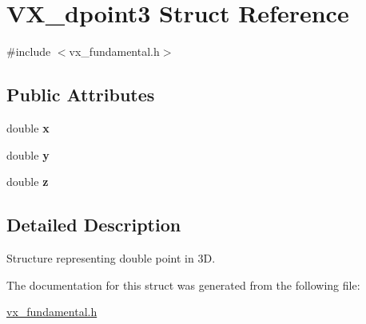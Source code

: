 \hypertarget{structVX__dpoint3}{\section{V\-X\-\_\-dpoint3 Struct Reference}
\label{structVX__dpoint3}
}


{\ttfamily \#include $<$vx\-\_\-fundamental.\-h$>$}

\subsection*{Public Attributes}
\begin{DoxyCompactItemize}
\item 
\hypertarget{structVX__dpoint3_a2e1eb10e8835c8c33f4262d98b1cf834}{double {\bfseries x}}\label{structVX__dpoint3_a2e1eb10e8835c8c33f4262d98b1cf834}

\item 
\hypertarget{structVX__dpoint3_a40815c6441413254a9c1edf8ff6e8019}{double {\bfseries y}}\label{structVX__dpoint3_a40815c6441413254a9c1edf8ff6e8019}

\item 
\hypertarget{structVX__dpoint3_aea8d6223b49870d50387bbf2a2e81d18}{double {\bfseries z}}\label{structVX__dpoint3_aea8d6223b49870d50387bbf2a2e81d18}

\end{DoxyCompactItemize}


\subsection{Detailed Description}
Structure representing double point in 3\-D. 

The documentation for this struct was generated from the following file\-:\begin{DoxyCompactItemize}
\item 
\hyperlink{vx__fundamental_8h}{vx\-\_\-fundamental.\-h}\end{DoxyCompactItemize}
